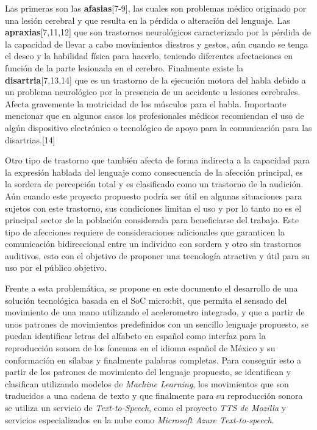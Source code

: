 \hfill \break
\justifying
Las primeras son las \textbf{afasias}[7-9], las cuales son problemas médico originado por una lesión cerebral y que resulta en la pérdida o alteración del lenguaje.  Las \textbf{apraxias}[7,11,12] que son trastornos neurológicos caracterizado por la pérdida de la capacidad de llevar a cabo movimientos diestros y gestos, aún cuando se tenga el deseo y la habilidad física para hacerlo, teniendo diferentes afectaciones en función de la parte lesionada en el cerebro. Finalmente existe la \textbf{disartria}[7,13,14] que es un trastorno de la ejecución motora del habla debido a un problema neurológico por la presencia de un accidente u lesiones cerebrales. Afecta gravemente la motricidad de los músculos para el habla. Importante mencionar que en algunos casos los profesionales médicos recomiendan el uso de algún dispositivo electrónico o tecnológico de apoyo para la comunicación para las disartrias.[14]

\hfill \break
\justifying
Otro tipo de trastorno que también afecta de forma indirecta a la capacidad para la expresión hablada del lenguaje como consecuencia de la afección principal, es la sordera de percepción total y es clasificado como un trastorno de la audición. Aún cuando este proyecto propuesto podría ser útil en algunas situaciones para sujetos con este trastorno, sus condiciones limitan el uso y por lo tanto no es el principal sector de la población considerada para beneficiarse del trabajo. Este tipo de afecciones requiere de consideraciones adicionales que garanticen la comunicación bidireccional entre un individuo con sordera y otro sin trastornos auditivos, esto con el objetivo de proponer una tecnología atractiva y útil para su uso por el público objetivo.

\hfill \break
\justifying
Frente a esta problemática, se propone en este documento el desarrollo de una solución tecnológica basada en el SoC micro:bit, que permita el sensado del movimiento de una mano utilizando el acelerometro integrado, y que a partir de unos patrones de movimientos predefinidos con un sencillo lenguaje propuesto, se puedan identificar letras del alfabeto en español como interfaz para la reproducción sonora de los fonemas en el idioma español de México y su conformación en sílabas y finalmente palabras completas.
Para conseguir esto a partir de los patrones de movimiento del lenguaje propuesto, se identifican y clasifican utilizando modelos de \textit{Machine Learning}, los movimientos que son traducidos a una cadena de texto y que finalmente para su reproducción sonora se utiliza un servicio de \textit{Text-to-Speech}, como el proyecto \textit{TTS de Mozilla} y servicios especializados en la nube como \textit{Microsoft Azure Text-to-speech}.


